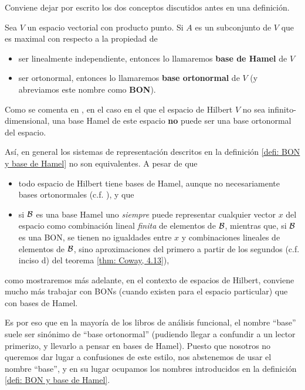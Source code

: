 Conviene dejar por escrito los dos conceptos discutidos
antes en una definición. 

\begin{defi} \label{defi: BON y base de Hamel}
Sea $V$ un espacio vectorial con producto punto.
Si $A$ es un subconjunto de $V$ que es 
maximal con respecto a la propiedad de
\begin{itemize}
\item ser linealmente independiente, entonces lo llamaremos
\textbf{base de Hamel} de $V$
\item ser ortonormal, entonces lo llamaremos
\textbf{base ortonormal} de $V$ (y abreviamos este
nombre como \textbf{BON}).
\end{itemize}
\end{defi}


Como se comenta en \cite{mse1},
en el caso en el que el espacio de Hilbert $V$
no sea infinito-dimensional, una base 
Hamel de este espacio \textbf{no} puede ser una
base ortonormal del espacio.

Así, en general los sistemas de representación
descritos en la definición 
\ref{defi: BON y base de Hamel} no son equivalentes.
A pesar de que
\begin{itemize}
	\item todo espacio de Hilbert tiene bases de Hamel, aunque
	no necesariamente bases ortonormales (c.f. 
	\cite{mse2}), y que
	
	\item si $\mathcal{B}$ es una base Hamel uno \textit{siempre}
	puede representar cualquier vector $x$ del espacio como combinación
	lineal \textit{finita} de elementos de $\mathcal{B}$, mientras que,
	si $\mathcal{B}$ es una BON, se tienen no igualdades entre 
	$x$ y combinaciones lineales de elementos de $\mathcal{B}$, sino aproximaciones
	del primero a partir de los segundos (c.f. inciso d)
	del teorema \ref{thm: Coway, 4.13}),
\end{itemize}

\noindent
como mostraremos más adelante, en el contexto de
espacios de Hilbert, conviene mucho más trabajar con BONs
(cuando existen para el espacio particular)
que con bases de Hamel. 


Es por eso que en la mayoría
de los libros de análisis funcional, el nombre ``base''
suele ser sinónimo de 
``base ortonormal''
(pudiendo llegar a confundir
a un lector primerizo, y llevarlo a pensar en
bases de Hamel). Puesto que
nosotros no queremos dar lugar a confusiones de este estilo,
nos abstenemos de usar el nombre ``base'', y en su lugar ocupamos
los nombres introducidos en la definición \ref{defi: BON y base de Hamel}.


